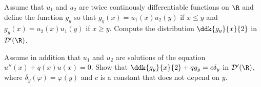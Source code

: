 \begin{alist}
\item Assume that $u_1$ and $u_2$ are twice continously differentiable
functions on $\R$ and define the function $g_y$ so that
$g_y(x)=u_1(x)u_2(y)$ if $x\leq y$ and $g_y(x)=u_2(x)u_1(y)$ if $x\geq
y$. Compute the distribution $\ddk{g_y}{x}{2}$ in $\mathcal{D}'(\R)$.
\item Assume in addition that $u_1$ and $u_2$ are solutions of the
equation $u''(x)+q(x)u(x)=0$. Show that
$\ddk{g_y}{x}{2}+qg_y=c\delta_y$ in $\mathcal{D}'(\R)$, where
$\delta_y(\varphi)=\varphi(y)$ and $c$ is a constant that does not
depend on $y$.
\end{alist}
